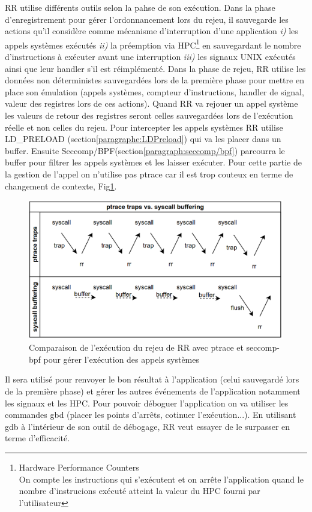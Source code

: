 RR utilise différents outils selon la pahse de son exécution\citep{RRimplem}. Dans la phase d'enregistrement pour gérer l'ordonnancement lors du rejeu, il sauvegarde les actions qu'il considère comme mécanisme d'interruption d'une application \textit{i)} les appels systèmes exécutés \textit{ii)} la préemption via HPC\footnote{Hardware Performance Counters \\ On compte les instructions qui s'exécutent et on arrête l'application quand le nombre d'instrucions exécuté atteint la valeur du HPC fourni par l'utilisateur} en sauvegardant le nombre d'instructions à exécuter avant une interruption \textit{iii)} les signaux UNIX exécutés ainsi que leur handler s'il est réimplémenté. Dans la phase de rejeu, RR utilise les données non déterministes sauvegardées lors de la première phase pour mettre en place son émulation (appels systèmes, compteur d'instructions, handler de signal, valeur des registres lors de ces actions). Quand RR va rejouer un appel système les valeurs de retour des registres seront celles sauvegardées lors de l'exécution réelle et non celles du rejeu. Pour intercepter les appels systèmes RR utilise LD\_PRELOAD (section\ref{paragraphe:LDPreload}) qui va les placer dans un buffer. Ensuite Seccomp/BPF(section\ref{paragraph:seccomp/bpf})  parcourra le buffer pour filtrer les appels systèmes et les laisser exécuter. Pour cette partie de la gestion de l'appel on n'utilise pas ptrace car il est trop couteux en terme de changement de contexte, Fig\ref{AS_RR}. 
\begin{figure}
\centering
\includegraphics[scale=0.30]{Pictures/png/RR_AS}
\caption{Comparaison de l'exécution du rejeu de RR avec ptrace et seccomp-bpf pour gérer l'exécution des appels systèmes}
\label{AS_RR}
\end{figure}
Il sera utilisé pour renvoyer le bon résultat à l'application (celui sauvegardé lors de la première phase) et gérer les autres événements de l'application notamment les signaux et les HPC. Pour pouvoir déboguer l'application on va utiliser les commandes gbd (placer les points d'arrêts, cotinuer l'exécution...). En utilisant gdb à l'intérieur de son outil de débogage, RR veut essayer de le surpasser en terme d'efficacité.

